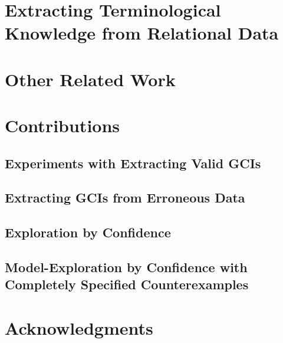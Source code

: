 \section{Extracting Terminological Knowledge from Relational Data}
\label{sec:extr-term-knowl}

%

\section{Other Related Work}
\label{sec:related-work}

%
%
%
%

\section{Contributions}
\label{sec:contributions}


\subsection{Experiments with Extracting Valid GCIs}
\label{sec:exper-with-extr}

\subsection{Extracting GCIs from Erroneous Data}
\label{sec:extracting-gcis-from}

\subsection{Exploration by Confidence}
\label{sec:expl-conf-2}

\subsection{Model-Exploration by Confidence with Completely Specified Counterexamples}
\label{sec:model-expl-conf}

\section{Acknowledgments}
\label{sec:acknowledgements}


